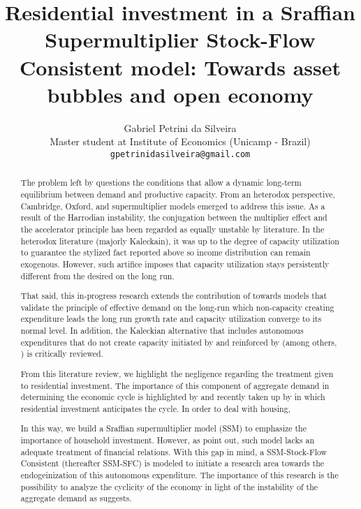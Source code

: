 \documentclass{article}
\title{Residential investment in a Sraffian Supermultiplier Stock-Flow Consistent model: Towards asset bubbles and open economy}
\author{
  Gabriel Petrini da Silveira\\
  Master student at Institute of Economics (Unicamp - Brazil)\\
  \texttt{gpetrinidasilveira@gmail.com} \\
}
\begin{document}
\maketitle

\begin{abstract}
The problem left by \textcite{harrod_essay_1939} questions the conditions that allow a dynamic long-term equilibrium between demand and productive capacity. 
From an heterodox perspective, Cambridge, Oxford, and supermultiplier models emerged to address this issue. 
As a result of the Harrodian instability, the conjugation between the multiplier effect and the accelerator principle has been regarded as equally unstable by literature. 
In the heterodox literature (majorly Kaleckain), it was up to the degree of capacity utilization to guarantee the stylized fact reported above so income distribution can remain  exogenous. 
However, such artifice imposes that capacity utilization  stays persistently different from the desired on the long run. 

That said, this in-progress research extends the contribution of \textcite{serrano_sraffian_1995} towards models that validate the principle of effective demand on the long-run which non-capacity creating expenditure leads the long run growth rate and capacity utilization converge to its normal level. 
In addition, the Kaleckian alternative  that includes autonomous expenditures that do not create capacity initiated by \textcite{allain_tackling_2015} and reinforced by \textcite{lavoie_convergence_2016} (among others,  \cites{dutt_growth_2016}{dutt_observations_2018}{hein_autonomous_2018}{nah_long-run_2017})  is critically reviewed. 

From this literature review, we highlight the negligence regarding the treatment given to residential investment. 
The importance of this component of aggregate demand in determining the economic cycle is highlighted by \textcite{leamer_housing_2007} and recently taken up by \textcite{fiebiger_semi-autonomous_2018} in which residential investment anticipates the cycle. 
In order to deal with housing, 

In this way, we build a Sraffian supermultiplier model (SSM) to emphasize the importance of household investment. 
However, as \textcite{brochier_supermultiplier_2018} point out, such model lacks an adequate treatment of financial relations. 
With this gap in mind, a SSM-Stock-Flow Consistent (thereafter SSM-SFC) is modeled to initiate a research area towards the endogeinization of this autonomous expenditure. 
The importance of this research is the possibility to analyze the cyclicity of the economy in light of the instability of the aggregate demand as \textcite{dejuan_hidden_2017} suggests.  


\end{abstract}
\end{document}
